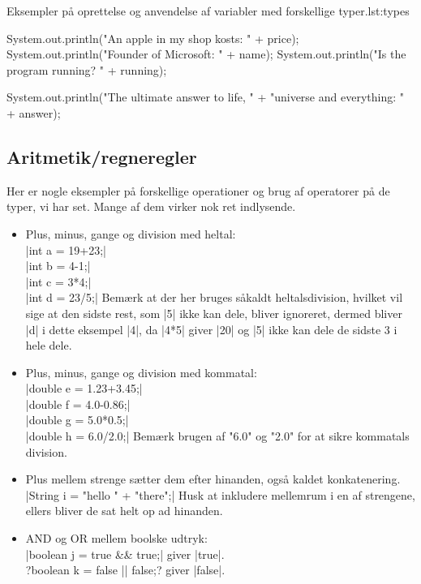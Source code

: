 {\begin{JavaCode}{Eksempler på oprettelse og anvendelse af variabler med forskellige typer.}{lst:types}
{{			System.out.println("An apple in my shop kosts: " 
						+ price);
			System.out.println("Founder of Microsoft: " + name);
			System.out.println("Is the program running? " 
						+ running);
			
			System.out.println("The ultimate answer to life, "
						+ "universe and everything: " 
						+ answer);
		}
	}
\end{JavaCode}

\subsection{Aritmetik/regneregler}
Her er nogle eksempler på forskellige operationer og brug af operatorer på de typer, vi har set. Mange af dem virker nok ret indlysende.

\begin{itemize}
	\item Plus, minus, gange og division med heltal: \\
	\JavaInline|int a = 19+23;| \\
	\JavaInline|int b = 4-1;| \\
	\JavaInline|int c = 3*4;| \\
	\JavaInline|int d = 23/5;| Bemærk at der her bruges såkaldt heltalsdivision, hvilket vil sige at den sidste rest, som \JavaInline|5| ikke kan dele, bliver ignoreret, dermed bliver \JavaInline|d| i dette eksempel \JavaInline|4|, da \JavaInline|4*5| giver \JavaInline|20| og \JavaInline|5| ikke kan dele de sidste 3 i hele dele.
	
	\item Plus, minus, gange og division med kommatal:\\
	\JavaInline|double e = 1.23+3.45;|\\
	\JavaInline|double f = 4.0-0.86;|\\
	\JavaInline|double g = 5.0*0.5;|\\
	\JavaInline|double h = 6.0/2.0;| Bemærk brugen af "6.0" og "2.0" for at sikre kommatals division.
	
	\item Plus mellem strenge sætter dem efter hinanden, også kaldet konkatenering.\\
	\JavaInline|String i = "hello " + "there";| Husk at inkludere mellemrum i en af strengene, ellers bliver de sat helt op ad hinanden.
	
	\item AND og OR mellem boolske udtryk:\\
	\JavaInline|boolean j = true && true;| giver \JavaInline|true|.\\
	\JavaInline?boolean k = false || false;? giver \JavaInline|false|.
	

\end{itemize}}
